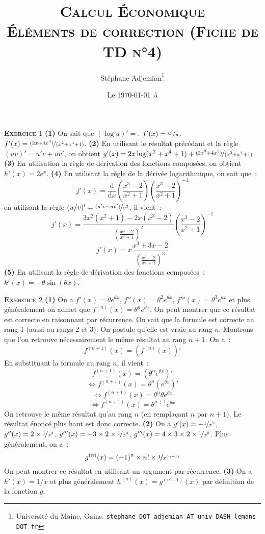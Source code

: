 \documentclass[10pt,a4paper,notitlepage]{article}
\newcommand{\exercice}[1]{\textsc{\textbf{Exercice}} #1}
\begin{document}
\title{\textsc{Calcul Économique\\ \small{Éléments de correction (Fiche de TD n°4)}}}
\author{Stéphane Adjemian\thanks{Université du Maine, Gains. \texttt{stephane DOT adjemian AT univ DASH lemans DOT fr}}}
\date{Le \today\ à \thistime}

\maketitle

\exercice{1} \textbf{(1)} On sait que $(\log u)' = $. $f'(x) =
\nicefrac{u'}{u}$. $f'(x) =
\nicefrac{(2x+4x^3)}{(x^2+x^4+1)}$. \textbf{(2)} En utilisant le
résultat précédant et la règle $(uv)'=u'v+uv'$, on obtient $g'(x) =
2x\log(x^2+x^4+1)+\nicefrac{(2x^3+4x^5)}{(x^2+x^4+1)}$. \textbf{(3)}
En utilisation la règle de dérivation des fonctions composées, on
obtient $h'(x) = 2e^x$. \textbf{(4)} En utilisant la règle de la
dérivée logarithmique, on sait que :
\[
j'(x) = \frac{\mathrm d}{\mathrm dx}\left(\frac{x^3-2}{x^2+1}\right)\left(\frac{x^3-2}{x^2+1}\right)^{-1}
\]
en utilisant la règle $(u/v)' = \nicefrac{(u'v-uv')}{v^2}$, il vient :
\[
j'(x) = \frac{3x^2(x^2+1)-2x(x^3-2)}{\left(\frac{x^3-2}{x^2+1}\right)^2}\left(\frac{x^3-2}{x^2+1}\right)^{-1}
\]
\[
j'(x) = x\frac{x^3+3x-2}{\left(\frac{x^3-2}{x^2+1}\right)^3}
\]
\textbf{(5)} En utilisant la règle de dérivation des fonctions
composées : $k'(x) = -\theta\sin(\theta x)$.

\bigskip

\exercice{2} \textbf{(1)} On a $f'(x) = \theta e^{\theta x}$, $f''(x)
= \theta^2 e^{\theta x}$, $f'''(x) = \theta^3 e^{\theta x}$ et plus généralement
on admet que $f^{(n)}(x) = \theta^n e^{\theta x}$. On peut montrer
que ce résultat est correcte en raisonnant par récurrence. On sait que
la formule est correcte au rang 1 (aussi au rangs 2 et 3). On postule qu'elle est
vraie au rang $n$. Montrons que l'on retrouve nécessairement le même
résultat au rang $n+1$. On a :
\[
f^{(n+1)}(x) = \left(f^{(n)}(x)\right)'
\]
En substituant la formule au rang $n$, il vient :
\[
f^{(n+1)}(x) = \left(\theta^n e^{\theta x}\right)'
\]
\[
\Leftrightarrow f^{(n+1)}(x) = \theta^n \left( e^{\theta x}\right)'
\]
\[
\Leftrightarrow f^{(n+1)}(x) = \theta^n \theta e^{\theta x}
\]
\[
\Leftrightarrow f^{(n+1)}(x) = \theta^{n+1} e^{\theta x}
\]
On retrouve le même résultat qu'au rang $n$ (en remplaçant $n$ par
$n+1$). Le résultat énoncé plus haut est donc correcte. \textbf{(2)}
On a $g'(x) = -\nicefrac{1}{x^2}$, $g''(x) = 2 \times \nicefrac{1}{x^3}$,
$g'''(x) = -3 \times 2 \times\nicefrac{1}{x^4}$, $g'''(x) = 4\times 3
\times 2 \times \nicefrac{1}{x^5}$. Plus généralement, on a :
\[
g^{(n)}(x) = (-1)^n \times n! \times \nicefrac{1}{x^{(n+1)}}
\]
On peut montrer ce résultat en utilisant un argument par
récurrence. \textbf{(3)} On a $h'(x) = 1/x$ et plus généralement
$h^{(n)}(x) = g^{(n-1)}(x)$ par définition de la fonction $g$.
\end{document}
